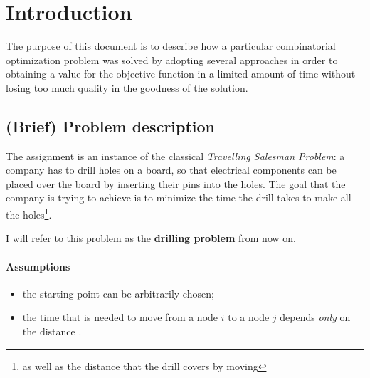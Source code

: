 \section{Introduction}
The purpose of this document is to describe how a particular combinatorial
optimization problem was solved by adopting several approaches in order to
obtaining a value for the objective function in a limited amount of time without
losing too much quality in the goodness of the solution.

\subsection{(Brief) Problem description}
The assignment is an instance of the classical \textit{Travelling Salesman
Problem}: a company has to drill holes on a board, so that electrical components
can be placed over the board by inserting their pins into the holes. The goal
that the company is trying to achieve is to minimize the time the drill
takes to make all the holes\footnote{as well as the distance that the drill
covers by moving}.

I will refer to this problem as the \textbf{drilling problem} from now on.

\paragraph{Assumptions}
\begin{itemize}
  \item the starting point can be arbitrarily chosen;
  \item the time that is needed to move from a node $i$ to a node $j$ depends
    \textit{only} on the distance .
\end{itemize}
